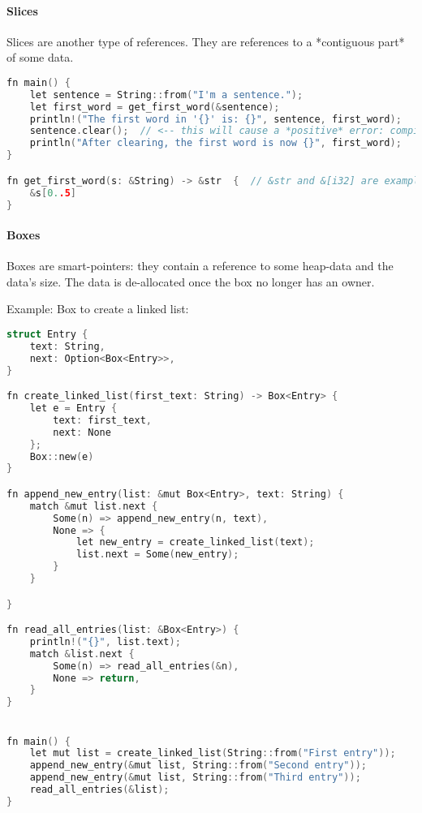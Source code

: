 \paragraph{Slices}
Slices are another type of references. They are references to a *contiguous part* of some data.

\begin{lstlisting}[language=c]
fn main() {
    let sentence = String::from("I'm a sentence.");
    let first_word = get_first_word(&sentence);
    println!("The first word in '{}' is: {}", sentence, first_word);
    sentence.clear();  // <-- this will cause a *positive* error: compiler will warn us that the sentence's data is still in use somewhere.
    println("After clearing, the first word is now {}", first_word);
}

fn get_first_word(s: &String) -> &str  {  // &str and &[i32] are examples of slice-types
    &s[0..5]
}
\end{lstlisting}


\paragraph{Boxes}
Boxes are smart-pointers: they contain a reference to some heap-data and the data's size. The data is de-allocated once the box no longer has an owner.

Example: Box to create a linked list:
\begin{lstlisting}[language=c]
struct Entry {
    text: String,
    next: Option<Box<Entry>>,
}

fn create_linked_list(first_text: String) -> Box<Entry> {
    let e = Entry {
        text: first_text,
        next: None
    };
    Box::new(e)
}

fn append_new_entry(list: &mut Box<Entry>, text: String) {
    match &mut list.next {
        Some(n) => append_new_entry(n, text),
        None => {
            let new_entry = create_linked_list(text);
            list.next = Some(new_entry);
        }
    }

}

fn read_all_entries(list: &Box<Entry>) {
    println!("{}", list.text);
    match &list.next {
        Some(n) => read_all_entries(&n),
        None => return,
    }
}


fn main() {
    let mut list = create_linked_list(String::from("First entry"));
    append_new_entry(&mut list, String::from("Second entry"));
    append_new_entry(&mut list, String::from("Third entry"));
    read_all_entries(&list);
}
\end{lstlisting}

